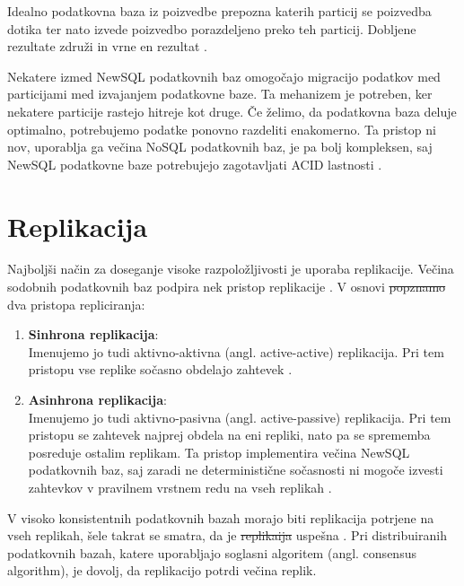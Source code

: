 \documentclass[a4paper, 12pt]{book}
\providecommand{\DIFaddtex}[1]{{\protect\color{blue}\uwave{#1}}} %
\providecommand{\DIFdeltex}[1]{{\protect\color{red}\sout{#1}}}                      %
\providecommand{\DIFaddbegin}{} %
\providecommand{\DIFaddend}{} %
\providecommand{\DIFdelbegin}{} %
\providecommand{\DIFdelend}{} %
\providecommand{\DIFadd}[1]{\texorpdfstring{\DIFaddtex{#1}}{#1}} %
\providecommand{\DIFdel}[1]{\texorpdfstring{\DIFdeltex{#1}}{}} %
\newcommand{\DIFscaledelfig}{0.5}
\newlength{\DIFdelgraphicswidth} %
\newlength{\DIFdelgraphicsheight} %
\newcommand{\DIFaddincludegraphics}[2][]{{\color{blue}\fbox{\DIFOincludegraphics[#1]{#2}}}} %
\newcommand{\DIFdelincludegraphics}[2][]{%
\sbox{\DIFdelgraphicsbox}{\DIFOincludegraphics[#1]{#2}}%
\settoboxwidth{\DIFdelgraphicswidth}{\DIFdelgraphicsbox} %
\settoboxtotalheight{\DIFdelgraphicsheight}{\DIFdelgraphicsbox} %
\scalebox{\DIFscaledelfig}{%
\parbox[b]{\DIFdelgraphicswidth}{\usebox{\DIFdelgraphicsbox}\\[-\baselineskip] \rule{\DIFdelgraphicswidth}{0em}}\llap{\resizebox{\DIFdelgraphicswidth}{\DIFdelgraphicsheight}{%
\setlength{\unitlength}{\DIFdelgraphicswidth}%
\begin{picture}(1,1)%
\thicklines\linethickness{2pt} %
{\color[rgb]{1,0,0}\put(0,0){\framebox(1,1){}}}%
{\color[rgb]{1,0,0}\put(0,0){\line( 1,1){1}}}%
{\color[rgb]{1,0,0}\put(0,1){\line(1,-1){1}}}%
\end{picture}%
}\hspace*{3pt}}} %
} %
\DeclareRobustCommand{\DIFaddbegin}{\DIFOaddbegin \let\includegraphics\DIFaddincludegraphics} %
\DeclareRobustCommand{\DIFaddend}{\DIFOaddend \let\includegraphics\DIFOincludegraphics} %
\DeclareRobustCommand{\DIFdelbegin}{\DIFOdelbegin \let\includegraphics\DIFdelincludegraphics} %
\DeclareRobustCommand{\DIFdelend}{\DIFOaddend \let\includegraphics\DIFOincludegraphics} %
\begin{document}
Idealno podatkovna baza iz poizvedbe prepozna katerih particij se poizvedba dotika ter nato izvede poizvedbo porazdeljeno preko teh particij. Dobljene rezultate združi in vrne en rezultat \cite{Pavlo2016Sep}.

Nekatere izmed NewSQL podatkovnih baz omogočajo migracijo podatkov med particijami med izvajanjem podatkovne baze. Ta mehanizem je potreben, ker nekatere particije rastejo hitreje kot druge. Če želimo, da podatkovna baza deluje optimalno, potrebujemo podatke ponovno razdeliti enakomerno. Ta pristop ni nov, uporablja ga večina NoSQL podatkovnih baz, je pa bolj kompleksen, saj NewSQL podatkovne baze 
potrebujejo zagotavljati ACID lastnosti \cite{Pavlo2016Sep}.

\section{Replikacija}

Najboljši način za doseganje visoke razpoložljivosti je uporaba replikacije. Večina sodobnih podatkovnih baz podpira nek pristop replikacije \cite{Pavlo2016Sep}. V osnovi \DIFdelbegin \DIFdel{popznamo }\DIFdelend \DIFaddbegin \DIFadd{poznamo }\DIFaddend dva pristopa repliciranja:
\begin{enumerate}
    \item \textbf{Sinhrona replikacija}:\\Imenujemo jo tudi aktivno-aktivna (angl. active-active) replikacija. Pri tem pristopu vse replike sočasno obdelajo zahtevek \cite{Pavlo2016Sep}.

    \item \textbf{Asinhrona replikacija}:\\Imenujemo jo tudi aktivno-pasivna (angl. active-passive) replikacija. Pri tem pristopu se zahtevek najprej obdela na eni repliki, nato pa se sprememba posreduje ostalim replikam. Ta pristop implementira večina NewSQL podatkovnih baz, saj zaradi ne deterministične sočas\-nosti ni mogoče izvesti zahtevkov v pravilnem vrstnem redu na vseh replikah \cite{Pavlo2016Sep, harding2017evaluation}.
\end{enumerate}

V visoko konsistentnih podatkovnih bazah morajo biti replikacija potrjene na vseh replikah, šele takrat se smatra, da je \DIFdelbegin \DIFdel{replikaija }\DIFdelend \DIFaddbegin \DIFadd{replikacija }\DIFaddend uspešna \cite{NewSqlInMemoryAnalytics}. Pri distribuiranih podatkovnih bazah, katere uporabljajo soglasni algoritem (angl. consensus algorithm), je dovolj, da replikacijo potrdi večina replik.
\end{document}
